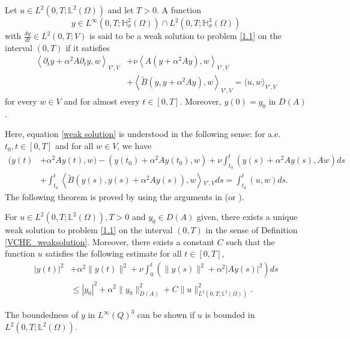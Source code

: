 \documentclass[reqno]{amsart}
\begin{document}
	\begin{definition}\label{VCHE_weaksolution}
		Let $ u \in L^2(0,T;\mathbb{L}^2(\Omega)) $ and let $ T > 0 $. A function \[ y \in L^\infty(0,T;\mathbb{H}_{\sigma}^2(\Omega)) \cap L^2(0,T;\mathbb{H}_{\sigma}^3(\Omega)) \] with $\displaystyle \frac{dy}{dt} \in L^2(0,T;V)  $ is said to be a weak solution to problem \eqref{1.1} on the interval $ (0,T)  $ if it satisfies
		\begin{align} \label{weak solution}
			\left \langle \partial_{t}y + \alpha^2 A\partial_{t}y, w \right \rangle_{V', V} &+ \nu \left \langle A(y + \alpha^2 Ay), w \right \rangle_{V', V} \nonumber \\
			& + \left \langle \widetilde{B}(y, y+\alpha^2 Ay), w \right \rangle_{V', V} = \langle u,w \rangle_{V',V}
		\end{align}
		for every $ w \in V $ and for almost every $ t \in [0,T] $. Moreover, $ y(0) = y_0 $ in $ D(A) $.
	\end{definition}
	Here, equation \eqref{weak solution} is understood in the following sense: for a.e. $ t_0, t \in [0,T] $ and for all $ w \in V $, we have
	\begin{align*}
		(y(t) &+ \alpha^2 Ay(t),w) - (y(t_0) + \alpha^2 Ay(t_0),w) + \nu \int_{t_0}^{t} (y(s) + \alpha^2 Ay(s),Aw) ds \\
		&+ \int_{t_0}^{t} \left \langle \widetilde{B}(y(s),y(s) + \alpha^2 Ay(s)),w \right \rangle {_{V', V}} ds = \int_{t_0}^{t} (u,w) ds.
	\end{align*}
	The following theorem is proved by using the arguments in \cite{schonbek2008} (or \cite{Coutand}).
	\begin{theorem}\label{existence_uniqueness}
		For $ u \in L^2(0,T;\mathbb{L}^2(\Omega)), T >0 $ and $ y_0 \in D(A) $ given, there exists a unique weak solution to problem \eqref{1.1} on the interval $ (0, T) $ in the sense of Definition \ref{VCHE_weaksolution}. Moreover, there exists a constant $ C $ such that the function $ u $ satisfies the following estimate for all $ t \in [0, T] $,
		\begin{align*}
			|y(t)|^2 &+\alpha^2 \|y(t)\|^2+\nu \int_{0}^{t}(\|y(s)\|^2+\alpha^2 |Ay(s)|^2)ds \\ & \leq |y_0|^2 + \alpha^2 \|y_0\|_{D(A)}^2+ C \|u\|^2_{L^2(0,T;\mathbb{L}^2(\Omega))}. 
		\end{align*}
	\end{theorem}
	\begin{remark}
		{\rm The boundedness of $ y $ in $ L^{\infty}(Q)^3 $ can be shown if $ u $ is bounded in $ L^2(0,T;\mathbb{L}^2(\Omega)) $. }
	\end{remark}
	
\end{document}
